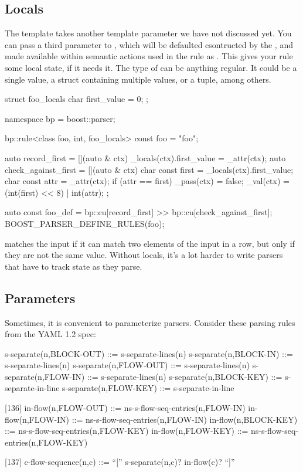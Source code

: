 \documentclass{MyBook}
\begin{document}
\subsection{Locals}

The  template takes another template parameter we have not discussed yet. You can pass a third parameter  to , which will be defaulted csontructed by the , and made available within semantic actions used in the rule as . This gives your rule some local state, if it needs it. The type of  can be anything regular. It could be a single value, a struct containing multiple values, or a tuple, among others.

\begin{code}
struct foo_locals
{
    char first_value = 0;
};

namespace bp = boost::parser;

bp::rule<class foo, int, foo_locals> const foo = "foo";

auto record_first = [](auto & ctx) { _locals(ctx).first_value = _attr(ctx); }
auto check_against_first = [](auto & ctx) {
    char const first = _locals(ctx).first_value;
    char const attr = _attr(ctx);
    if (attr == first)
        _pass(ctx) = false;
    _val(ctx) = (int(first) << 8) | int(attr);
};

auto const foo_def = bp::cu[record_first] >> bp::cu[check_against_first];
BOOST_PARSER_DEFINE_RULES(foo);
\end{code}

 matches the input if it can match two elements of the input in a row, but only if they are not the same value. Without locals, it's a lot harder to write parsers that have to track state as they parse.

\subsection{Parameters}

Sometimes, it is convenient to parameterize parsers. Consider these parsing rules from the YAML 1.2 spec:

\begin{code}
[80]
s-separate(n,BLOCK-OUT) ::= s-separate-lines(n)
s-separate(n,BLOCK-IN)  ::= s-separate-lines(n)
s-separate(n,FLOW-OUT)  ::= s-separate-lines(n)
s-separate(n,FLOW-IN)   ::= s-separate-lines(n)
s-separate(n,BLOCK-KEY) ::= s-separate-in-line
s-separate(n,FLOW-KEY)  ::= s-separate-in-line

[136]
in-flow(n,FLOW-OUT)  ::= ns-s-flow-seq-entries(n,FLOW-IN)
in-flow(n,FLOW-IN)   ::= ns-s-flow-seq-entries(n,FLOW-IN)
in-flow(n,BLOCK-KEY) ::= ns-s-flow-seq-entries(n,FLOW-KEY)
in-flow(n,FLOW-KEY)  ::= ns-s-flow-seq-entries(n,FLOW-KEY)

[137]
c-flow-sequence(n,c) ::= “[” s-separate(n,c)? in-flow(c)? “]”
\end{code}
\end{document}
